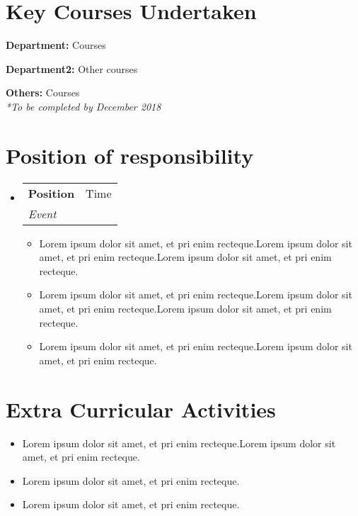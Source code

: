 \documentclass[a4paper,12pt]{article}
\makeatletter
\newcommand{\resumeSubheading}[4]{
  \vspace{2pt}\item[\huge|]
    \begin{tabular*}{0.97\textwidth}{l@{\extracolsep{\fill}}r}
      \textbf{#1} & #2 \\
      \textit{\small #3} & \textit{\small #4} \\
    \end{tabular*}\vspace{-5pt}
}
\newcommand{\resumeSubHeadingListStart}{\begin{itemize}[leftmargin=*]}
\newcommand{\resumeSubHeadingListEnd}{\end{itemize}}
\makeatother
\begin{document}
\vspace*{-10pt}
\section{Key Courses Undertaken}
  
    \hspace*{1em}\textbf{Department:} \hspace{7.3em} Courses
    
    \hspace*{1em}\textbf{Department2:} \hspace{6.7em} Other courses
    
   \hspace*{1em}\textbf{Others:} \hspace{9.9em} Courses \\
   \hfill \textit{*To be completed by December 2018} \\
\vspace*{-15pt}
\section{Position of responsibility}
    \resumeSubHeadingListStart 
    \resumeSubheading{Position}{Time}{Event}{}
    \begin{itemize}[nosep]
        
        \item Lorem ipsum dolor sit amet, et pri enim recteque.Lorem ipsum dolor sit amet, et pri enim recteque.Lorem ipsum dolor sit amet, et pri enim recteque.
        \item Lorem ipsum dolor sit amet, et pri enim recteque.Lorem ipsum dolor sit amet, et pri enim recteque.Lorem ipsum dolor sit amet, et pri enim recteque.
        \item Lorem ipsum dolor sit amet, et pri enim recteque.Lorem ipsum dolor sit amet, et pri enim recteque.
    \end{itemize}
    
    \resumeSubHeadingListEnd



\vspace*{-20pt}
\section{Extra Curricular Activities}

\begin{itemize}[nosep,wide]
    \item Lorem ipsum dolor sit amet, et pri enim recteque.Lorem ipsum dolor sit amet, et pri enim recteque.
    \item Lorem ipsum dolor sit amet, et pri enim recteque.
     \item Lorem ipsum dolor sit amet, et pri enim recteque. 
\end{itemize}
\end{document}
